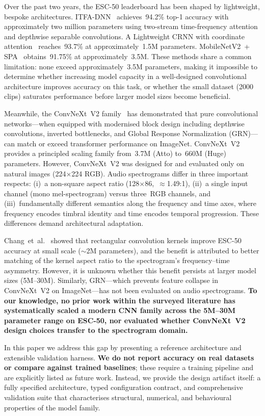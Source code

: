 \documentclass{article}
\begin{document}
Over the past two years, the ESC-50 leaderboard has been shaped by lightweight,
bespoke architectures. ITFA-DNN~\cite{chen2025itfa} achieves~94.2\% top-1
accuracy with approximately two million parameters using two-stream
time-frequency attention and depthwise separable convolutions. A Lightweight
CRNN with coordinate attention~\cite{crnncoordatt2026} reaches~93.7\% at
approximately~1.5M parameters. MobileNetV2~+
SPA~\cite{mobilenetv2spa2025} obtains~91.75\% at approximately~3.5M. These
methods share a common limitation: none exceed approximately~3.5M parameters,
making it impossible to determine whether increasing model capacity in a
well-designed convolutional architecture improves accuracy on this task, or
whether the small dataset (2000 clips) saturates performance before larger
model sizes become beneficial.

Meanwhile, the ConvNeXt~V2 family~\cite{woo2023convnextv2} has demonstrated
that pure convolutional networks---when equipped with modernised block design
including depthwise convolutions, inverted bottlenecks, and Global Response
Normalization (GRN)---can match or exceed transformer performance on ImageNet.
ConvNeXt~V2 provides a principled scaling family from~3.7M (Atto) to~660M
(Huge) parameters. However, ConvNeXt~V2 was designed for and evaluated only on
natural images (224$\times$224 RGB). Audio spectrograms differ in three
important respects: (i)~a non-square aspect ratio (128$\times$86,~$\approx$1.49:1),
(ii)~a single input channel (mono mel-spectrogram) versus three~RGB channels,
and (iii)~fundamentally different semantics along the frequency and time axes,
where frequency encodes timbral identity and time encodes temporal progression.
These differences demand architectural adaptation.

Chang~et~al.~\cite{chang2026rectangular} showed that rectangular convolution
kernels improve ESC-50 accuracy at small scale ($\sim$2M parameters), and the
benefit is attributed to better matching of the kernel aspect ratio to the
spectrogram's frequency--time asymmetry. However, it is unknown whether this
benefit persists at larger model sizes (5M--30M). Similarly, GRN---which
prevents feature collapse in ConvNeXt~V2 on ImageNet---has not been evaluated
on audio spectrograms. \textbf{To our knowledge, no prior work within the surveyed
literature has systematically scaled a modern CNN family across the 5M--30M
parameter range on ESC-50, nor evaluated whether ConvNeXt~V2 design choices
transfer to the spectrogram domain.}

In this paper we address this gap by presenting a reference architecture and
extensible validation harness. \textbf{We do not report accuracy on real
datasets or compare against trained baselines}; these require a training
pipeline and are explicitly listed as future work. Instead, we provide the
design artifact itself: a fully specified architecture, typed configuration
contract, and comprehensive validation suite that characterises structural,
numerical, and behavioural properties of the model family.
\end{document}
